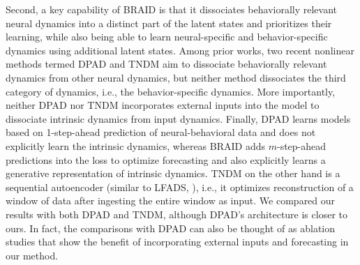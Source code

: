 \documentclass{article} %
\newcommand{\ourmethod}{BRAID}
\begin{document}
Second, a key capability of \ourmethod{} is that it dissociates behaviorally relevant neural dynamics into a distinct part of the latent states and prioritizes their learning, while also being able to learn neural-specific and behavior-specific dynamics using additional latent states. Among prior works, two recent nonlinear methods termed DPAD \citep{sani2024dissociative} and TNDM \citep{hurwitz2021targeted} aim to dissociate behaviorally relevant dynamics from other neural dynamics, but neither method dissociates the third category of dynamics, i.e., the behavior-specific dynamics. More importantly, neither DPAD nor TNDM incorporates external inputs into the model to dissociate intrinsic dynamics from input dynamics. Finally, DPAD learns models based on 1-step-ahead prediction of neural-behavioral data and does not explicitly learn the intrinsic dynamics, whereas \ourmethod{} adds \(m\)-step-ahead predictions into the loss to optimize forecasting and also explicitly learns a generative representation of intrinsic dynamics. TNDM on the other hand is a sequential autoencoder (similar to LFADS, \citealp{pandarinath2018inferring}), i.e., it optimizes reconstruction of a window of data after ingesting the entire window as input. We compared our results with both DPAD and TNDM, although DPAD's architecture is closer to ours. In fact, the comparisons with DPAD can also be thought of as ablation studies that show the benefit of incorporating external inputs and forecasting in our method. 
\end{document}
